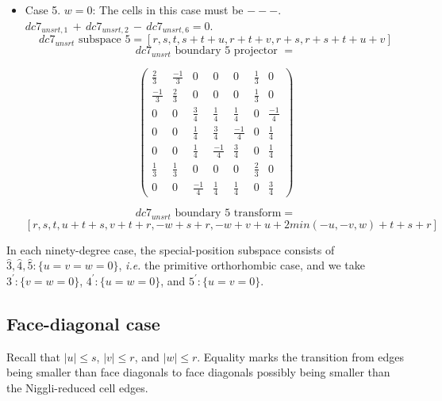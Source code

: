 \documentclass[preprint]{iucr}              %
\begin{document}
{\begin{itemize}
{      \[dc7_{unsrt} \text{ boundary 4 transform}=\]
      \[ [r,s,t,u+t+s,-v+t+r,w+s+r,w-v+u+2 min(-u,v,-w)+t+s+r]\]
      
     }
     \item{Case 5. $w=0$:  The cells in this case must be $---$.\\
     $dc7_{unsrt,1}\,+\,dc7_{unsrt,2}\,-\,dc7_{unsrt,6}=0$.
     \[dc7_{unsrt} \text{ subspace 5}=[r,s,t,s+t+u,r+t+v,r+s,r+s+t+u+v]\]
     \[dc7_{unsrt} \text{ boundary 5 projector } =\]
\begin{center}
\begin{equation*}
\begin{pmatrix}
\frac{2}{3}&\frac{-1}{3}&0&0&0&\frac{1}{3}&0\\[.25em]
\frac{-1}{3}&\frac{2}{3}&0&0&0&\frac{1}{3}&0\\[.25em]
0&0&\frac{3}{4}&\frac{1}{4}&\frac{1}{4}&0&\frac{-1}{4}\\[.25em]
0&0&\frac{1}{4}&\frac{3}{4}&\frac{-1}{4}&0&\frac{1}{4}\\[.25em]
0&0&\frac{1}{4}&\frac{-1}{4}&\frac{3}{4}&0&\frac{1}{4}\\[.25em]
\frac{1}{3}&\frac{1}{3}&0&0&0&\frac{2}{3}&0\\[.25em]
0&0&\frac{-1}{4}&\frac{1}{4}&\frac{1}{4}&0&\frac{3}{4}
\end{pmatrix}
\end{equation*}
\end{center}


      \[dc7_{unsrt} \text{ boundary 5 transform}=\]
      \[[r,s,t,u+t+s,v+t+r,-w+s+r,-w+v+u+2 min(-u,-v,w)+t+s+r]\]
     }
 \end{itemize}
 
 In each ninety-degree case, the special-position subspace consists of $\hat{3}, \hat{4}, \hat{5}\!: \{u = v = w = 0\}$,
{\it i.e.} the primitive orthorhombic case, and we take
$3^\prime\!: \{v = w = 0\}$, $4^\prime\!: \{u = w = 0\}$, and $5^\prime\!: \{u = v = 0\}$.


\subsection{Face-diagonal  case}
 
 Recall that $|u| \leq s$, $|v| \leq r$, and $|w| \leq r$.  Equality marks
 the transition from edges being smaller than face diagonals to face diagonals
 possibly being smaller than the Niggli-reduced cell edges.


}
\end{document}
